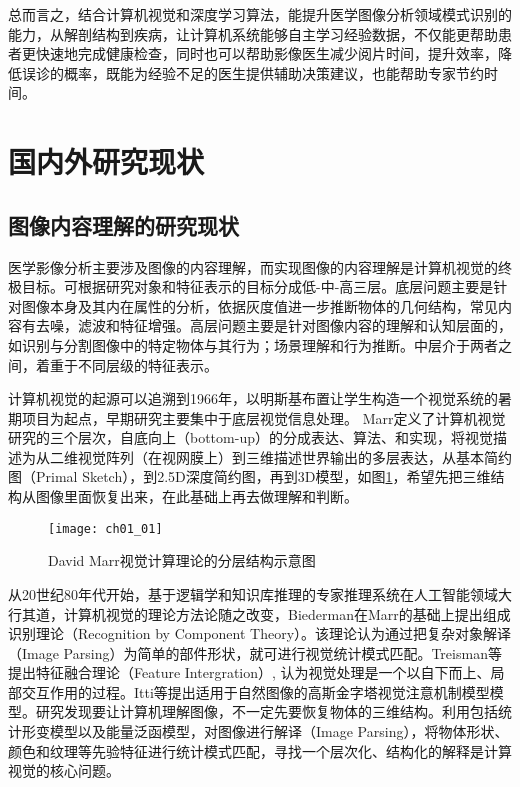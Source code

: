 总而言之，结合计算机视觉和深度学习算法，能提升医学图像分析领域模式识别的能力，从解剖结构到疾病，让计算机系统能够自主学习经验数据，不仅能更帮助患者更快速地完成健康检查，同时也可以帮助影像医生减少阅片时间，提升效率，降低误诊的概率，既能为经验不足的医生提供辅助决策建议，也能帮助专家节约时间。   

\section{国内外研究现状}

\subsection{图像内容理解的研究现状}

医学影像分析主要涉及图像的内容理解，而实现图像的内容理解是计算机视觉的终极目标\citep{Cootes2004}。可根据研究对象和特征表示的目标分成低-中-高三层。底层问题主要是针对图像本身及其内在属性的分析，依据灰度值进一步推断物体的几何结构，常见内容有去噪，滤波和特征增强。高层问题主要是针对图像内容的理解和认知层面的，如识别与分割图像中的特定物体与其行为；场景理解和行为推断。中层介于两者之间，着重于不同层级的特征表示。

计算机视觉的起源可以追溯到1966年，以明斯基布置让学生构造一个视觉系统的暑期项目为起点，早期研究主要集中于底层视觉信息处理。
Marr\citep{Marr1982Vision}定义了计算机视觉研究的三个层次，自底向上（bottom-up）的分成表达、算法、和实现，将视觉描述为从二维视觉阵列（在视网膜上）到三维描述世界输出的多层表达，从基本简约图（Primal Sketch），到2.5D深度简约图，再到3D模型，如图\ref{fig:ch01_01}，希望先把三维结构从图像里面恢复出来，在此基础上再去做理解和判断。

\begin{figure}[!htbp]
    \centering
    \texttt{[image: ch01\_01]}
    \caption{David Marr视觉计算理论的分层结构示意图}
    \label{fig:ch01_01}
\end{figure}

从20世纪80年代开始，基于逻辑学和知识库推理的专家推理系统在人工智能领域大行其道，计算机视觉的理论方法论随之改变，Biederman在Marr的基础上提出组成识别理论（Recognition by Component Theory）。该理论认为通过把复杂对象解译（Image Parsing）为简单的部件形状，就可进行视觉统计模式匹配。Treisman等\citep{treisman1980a}提出特征融合理论（Feature Intergration）, 认为视觉处理是一个以自下而上、局部交互作用的过程。Itti等\citep{Itti2005}提出适用于自然图像的高斯金字塔视觉注意机制模型模型。研究发现要让计算机理解图像，不一定先要恢复物体的三维结构。利用包括统计形变模型\citep{Cootes2004}以及能量泛函模型\citep{Kass1988}，对图像进行解译（Image Parsing），将物体形状、颜色和纹理等先验特征进行统计模式匹配，寻找一个层次化、结构化的解释是计算视觉的核心问题。


